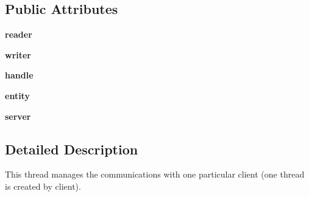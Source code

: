 \subsection*{\-Public \-Attributes}
\begin{DoxyCompactItemize}
\item 
\hypertarget{classsrc_1_1network_1_1_server_connection_a27084c15d360cb8fa3a0f8b3d252a932}{{\bfseries reader}}\label{classsrc_1_1network_1_1_server_connection_a27084c15d360cb8fa3a0f8b3d252a932}

\item 
\hypertarget{classsrc_1_1network_1_1_server_connection_acf3b34193195c00cec29949ed22c5eff}{{\bfseries writer}}\label{classsrc_1_1network_1_1_server_connection_acf3b34193195c00cec29949ed22c5eff}

\item 
\hypertarget{classsrc_1_1network_1_1_server_connection_a57f0bb2d7eeb65b75c952684f4450eea}{{\bfseries handle}}\label{classsrc_1_1network_1_1_server_connection_a57f0bb2d7eeb65b75c952684f4450eea}

\item 
\hypertarget{classsrc_1_1network_1_1_server_connection_abdcb0a83946f32c837d13a0eb3fdb3cc}{{\bfseries entity}}\label{classsrc_1_1network_1_1_server_connection_abdcb0a83946f32c837d13a0eb3fdb3cc}

\item 
\hypertarget{classsrc_1_1network_1_1_server_connection_a59bdd9af2ccf5cc3a0c14b13b615cdf1}{{\bfseries server}}\label{classsrc_1_1network_1_1_server_connection_a59bdd9af2ccf5cc3a0c14b13b615cdf1}

\end{DoxyCompactItemize}


\subsection{\-Detailed \-Description}
\begin{DoxyVerb}
This thread manages the communications with one particular client (one
thread is created by client).
\end{DoxyVerb}
 

